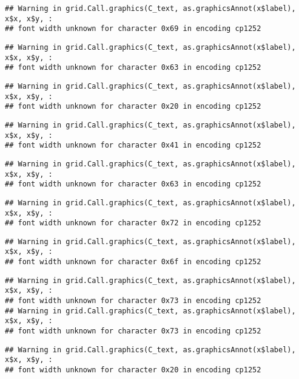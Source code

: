 \documentclass[
]{article}
\begin{document}
\begin{verbatim}
## Warning in grid.Call.graphics(C_text, as.graphicsAnnot(x$label), x$x, x$y, :
## font width unknown for character 0x69 in encoding cp1252
\end{verbatim}

\begin{verbatim}
## Warning in grid.Call.graphics(C_text, as.graphicsAnnot(x$label), x$x, x$y, :
## font width unknown for character 0x63 in encoding cp1252
\end{verbatim}

\begin{verbatim}
## Warning in grid.Call.graphics(C_text, as.graphicsAnnot(x$label), x$x, x$y, :
## font width unknown for character 0x20 in encoding cp1252
\end{verbatim}

\begin{verbatim}
## Warning in grid.Call.graphics(C_text, as.graphicsAnnot(x$label), x$x, x$y, :
## font width unknown for character 0x41 in encoding cp1252
\end{verbatim}

\begin{verbatim}
## Warning in grid.Call.graphics(C_text, as.graphicsAnnot(x$label), x$x, x$y, :
## font width unknown for character 0x63 in encoding cp1252
\end{verbatim}

\begin{verbatim}
## Warning in grid.Call.graphics(C_text, as.graphicsAnnot(x$label), x$x, x$y, :
## font width unknown for character 0x72 in encoding cp1252
\end{verbatim}

\begin{verbatim}
## Warning in grid.Call.graphics(C_text, as.graphicsAnnot(x$label), x$x, x$y, :
## font width unknown for character 0x6f in encoding cp1252
\end{verbatim}

\begin{verbatim}
## Warning in grid.Call.graphics(C_text, as.graphicsAnnot(x$label), x$x, x$y, :
## font width unknown for character 0x73 in encoding cp1252
## Warning in grid.Call.graphics(C_text, as.graphicsAnnot(x$label), x$x, x$y, :
## font width unknown for character 0x73 in encoding cp1252
\end{verbatim}

\begin{verbatim}
## Warning in grid.Call.graphics(C_text, as.graphicsAnnot(x$label), x$x, x$y, :
## font width unknown for character 0x20 in encoding cp1252
\end{verbatim}
\end{document}
